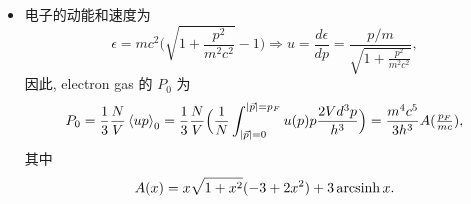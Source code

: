 \begin{itemize}
	\item 电子的动能和速度为
	\begin{equation}
		\epsilon = m c^2 \Big( \sqrt{1 + \frac{p^2}{m^2 c^2}} - 1 \Big) \Longrightarrow u = \frac{d\epsilon}{dp} = \frac{p / m}{\sqrt{1 + \frac{p^2}{m^2 c^2}}},
	\end{equation}
	因此, electron gas 的 $P_0$ 为
	\begin{equation} \label{8.4.5}
		P_0 = \frac{1}{3} \frac{N}{V} \braket{u p}_0 = \frac{1}{3} \frac{N}{V} \Big( \frac{1}{N} \int_{|\vec{p}| = 0}^{|\vec{p}| = p_F} u(p) p \frac{2 V d^3 p}{h^3} \Big) = \frac{m^4 c^5}{3 h^3} A({\textstyle \frac{p_F}{m c}}),
	\end{equation}
	其中
	\begin{equation}
		A(x) = x \sqrt{1 + x^2} (- 3 + 2 x^2) + 3 \operatorname{arcsinh} x.
	\end{equation}
\end{itemize}

